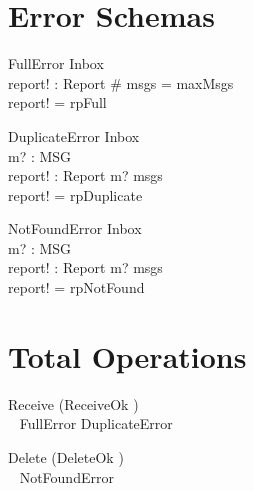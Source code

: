 \documentclass{article}
\begin{document}
\section{Error Schemas}

\begin{schema}{FullError}
  \Xi Inbox \\
  report! : Report
\where
  \# msgs = maxMsgs \\
  report! = rpFull
\end{schema}

\begin{schema}{DuplicateError}
  \Xi Inbox \\
  m? : MSG \\
  report! : Report
\where
  m? \in msgs \\
  report! = rpDuplicate
\end{schema}

\begin{schema}{NotFoundError}
  \Xi Inbox \\
  m? : MSG \\
  report! : Report
\where
  m? \notin msgs \\
  report! = rpNotFound
\end{schema}

\section{Total Operations}

\begin{zed}
  Receive  (ReceiveOk \land [report! : Report | report! = rpOk]) \\
    \quad~ \lor FullError \lor DuplicateError
\end{zed}

\begin{zed}
  Delete  (DeleteOk \land [report! : Report | report! = rpOk]) \\
    \quad~ \lor NotFoundError
\end{zed}
\end{document}
